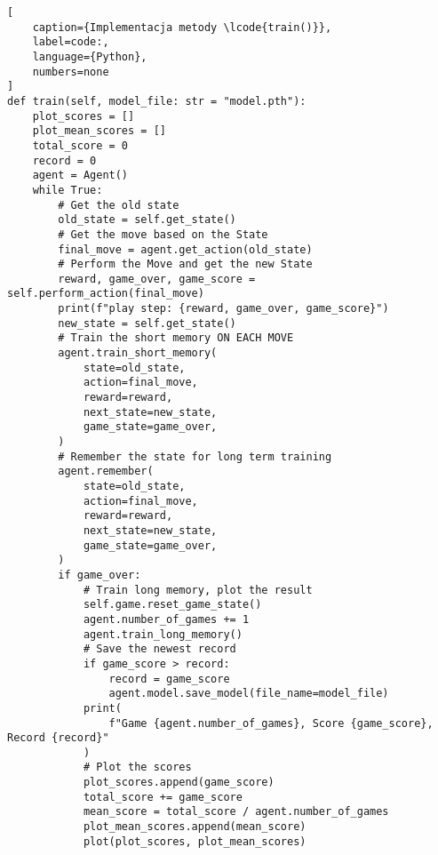 \begin{onepage}
    \begin{lstlisting}[
    caption={Implementacja metody \lcode{train()}},
    label=code:,
    language={Python},
    numbers=none
]
def train(self, model_file: str = "model.pth"):
    plot_scores = []
    plot_mean_scores = []
    total_score = 0
    record = 0
    agent = Agent()
    while True:
        # Get the old state
        old_state = self.get_state()
        # Get the move based on the State
        final_move = agent.get_action(old_state)
        # Perform the Move and get the new State
        reward, game_over, game_score = self.perform_action(final_move)
        print(f"play step: {reward, game_over, game_score}")
        new_state = self.get_state()
        # Train the short memory ON EACH MOVE
        agent.train_short_memory(
            state=old_state,
            action=final_move,
            reward=reward,
            next_state=new_state,
            game_state=game_over,
        )
        # Remember the state for long term training
        agent.remember(
            state=old_state,
            action=final_move,
            reward=reward,
            next_state=new_state,
            game_state=game_over,
        )
        if game_over:
            # Train long memory, plot the result
            self.game.reset_game_state()
            agent.number_of_games += 1
            agent.train_long_memory()
            # Save the newest record
            if game_score > record:
                record = game_score
                agent.model.save_model(file_name=model_file)
            print(
                f"Game {agent.number_of_games}, Score {game_score}, Record {record}"
            )
            # Plot the scores
            plot_scores.append(game_score)
            total_score += game_score
            mean_score = total_score / agent.number_of_games
            plot_mean_scores.append(mean_score)
            plot(plot_scores, plot_mean_scores)
    \end{lstlisting}
\end{onepage}
